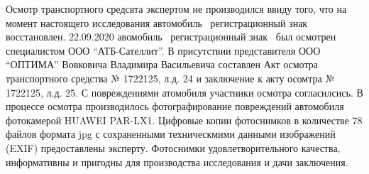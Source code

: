    Осмотр транспортного средсвта экспертом не производился ввиду того, что на момент настоящего исследования автомобиль  \, регистрационный знак  \, восстановлен.
   22.09.2020 авомобиль  \, регистрационный знак \, был осмотрен специалистом ООО \enquote{АТБ-Сателлит}. В присутствии представителя ООО \enquote{ОПТИМА} Вовковича Владимира Васильевича составлен Акт осмотра  транспортного средства № 1722125, л.д. 24 и заключение к акту осомтра  № 1722125, л.д. 25. С повреждениями атомобиля участники осмотра согласилсись.  В процессе осмотра производилось фотографирование повреждений автомобиля \, фотокамерой HUAWEI PAR-LX1. Цифровые копии фотоснимков в количестве 78 файлов формата jpg  с сохраненными техническмими данными изображений (EXIF) предоставлены эксперту. Фотоснимки удовлетворительного качества, информативны и пригодны для производства исследования и дачи заключения.
                       

